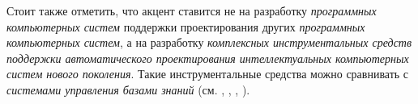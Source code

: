 Стоит также отметить, что акцент ставится не на разработку \textit{программных компьютерных систем} поддержки проектирования других \textit{программных компьютерных систем}, а на разработку \textit{комплексных инструментальных средств поддержки автоматического проектирования интеллектуальных компьютерных систем нового поколения}. Такие инструментальные средства можно сравнивать с \textit{системами управления базами знаний} (см. , , , ).

